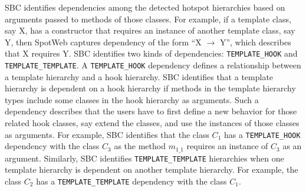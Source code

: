 \documentclass[conference]{IEEEtran}
\newcommand{\CodeIn}[1]{{\small\texttt{#1}}}
\begin{document}
SBC identifies dependencies among the detected hotspot hierarchies based on arguments
passed to methods of those classes. For example, if a template class, say X, has a constructor that requires
an instance of another template class, say Y, then SpotWeb captures
dependency of the form ``X $\rightarrow$ Y'', which describes that X
requires Y. SBC identifies two kinds of dependencies: \CodeIn{TEMPLATE\_HOOK}
and \CodeIn{TEMPLATE\_TEMPLATE}. A \CodeIn{TEMPLATE\_HOOK} dependency defines a relationship
between a template hierarchy and a hook hierarchy. SBC identifies that
a template hierarchy is dependent on a hook hierarchy if methods in the template
hierarchy types include some classes in the hook hierarchy as arguments. Such a dependency describes
that the users have to first define a new behavior for those related hook classes, say
extend the classes, and use the instances of those classes
as arguments. For example, SBC identifies that the class $C_1$ has a 
\CodeIn{TEMPLATE\_HOOK} dependency with 
the class $C_3$ as the method \CodeIn{$m_{1\_1}$} requires an instance of $C_3$ 
as an argument. Similarly, SBC identifies \CodeIn{TEMPLATE\_TEMPLATE}
hierarchies when one template hierarchy is dependent on another template hierarchy.
For example, the class $C_2$ has a \CodeIn{TEMPLATE\_TEMPLATE} dependency
with the class $C_1$. 
\end{document}
